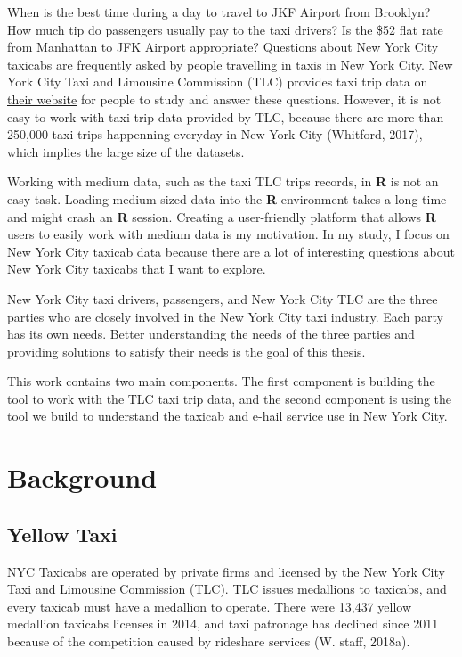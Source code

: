 \documentclass[12pt,twoside]{reedthesis}
\theoremstyle{definition}
\theoremstyle{definition}
\theoremstyle{definition}
\theoremstyle{remark}
\begin{document}
When is the best time during a day to travel to JKF Airport from
Brooklyn? How much tip do passengers usually pay to the taxi drivers? Is
the \$52 flat rate from Manhattan to JFK Airport appropriate? Questions
about New York City taxicabs are frequently asked by people travelling
in taxis in New York City. New York City Taxi and Limousine Commission
(TLC) provides taxi trip data on
\href{http://www.nyc.gov/html/tlc/html/about/trip_record_data.shtml}{their
website} for people to study and answer these questions. However, it is
not easy to work with taxi trip data provided by TLC, because there are
more than 250,000 taxi trips happenning everyday in New York City
(Whitford, 2017), which implies the large size of the datasets.

Working with medium data, such as the taxi TLC trips records, in
\textbf{R} is not an easy task. Loading medium-sized data into the
\textbf{R} environment takes a long time and might crash an \textbf{R}
session. Creating a user-friendly platform that allows \textbf{R} users
to easily work with medium data is my motivation. In my study, I focus
on New York City taxicab data because there are a lot of interesting
questions about New York City taxicabs that I want to explore.

New York City taxi drivers, passengers, and New York City TLC are the
three parties who are closely involved in the New York City taxi
industry. Each party has its own needs. Better understanding the needs
of the three parties and providing solutions to satisfy their needs is
the goal of this thesis.

This work contains two main components. The first component is building
the tool to work with the TLC taxi trip data, and the second component
is using the tool we build to understand the taxicab and e-hail service
use in New York City.

\section{Background}\label{background}

\subsection{Yellow Taxi}\label{yellow-taxi}

NYC Taxicabs are operated by private firms and licensed by the New York
City Taxi and Limousine Commission (TLC). TLC issues medallions to
taxicabs, and every taxicab must have a medallion to operate. There were
13,437 yellow medallion taxicabs licenses in 2014, and taxi patronage
has declined since 2011 because of the competition caused by rideshare
services (W. staff, 2018a).
\end{document}
